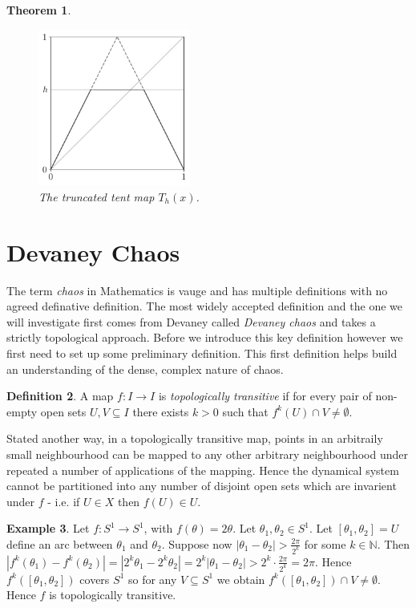 \documentclass[11pt,a4paper,oneside]{memoir}
\theoremstyle{plain}
\newtheorem{thm}{Theorem}[chapter]
\theoremstyle{definition}
\newtheorem{defn}[thm]{Definition}
\newtheorem{exmp}[thm]{Example}
\begin{document}
\begin{thm}
    \begin{figure}[h]
        \centering
        \includegraphics[width=5cm]{truncated_tent}
        \caption{The truncated tent map $T_h(x)$.}
        \label{fig:truncated_tent}
    \end{figure}
\end{thm}

\section{Devaney Chaos}

The term \emph{chaos} in Mathematics is vauge and has multiple definitions with no agreed definative definition. The most widely accepted definition and the one we will investigate first comes from Devaney \cite{devaney} called \emph{Devaney chaos} and takes a strictly topological approach. Before we introduce this key definition however we first need to set up some preliminary definition. This first definition helps build an understanding of the dense, complex nature of chaos.

\begin{defn}
    A map $f: I \to I$ is \emph{topologically transitive} if for every pair of non-empty open sets $U, V \subseteq I$ there exists $k > 0$ such that $f^k(U) \cap V \neq \emptyset$.
\end{defn}

Stated another way, in a topologically transitive map, points in an arbitraily small neighbourhood can be mapped to any other arbitrary neighbourhood under repeated a number of applications of the mapping. Hence the dynamical system cannot be partitioned into any number of disjoint open sets which are invarient under $f$ - i.e. if $U \in X$ then $f(U) \in U$.

\begin{exmp}
    Let $f: S^1 \to S^1$, with $f(\theta) = 2\theta$. Let $\theta_1, \theta_2 \in S^1$. Let $[\theta_1, \theta_2] = U$ define an arc between $\theta_1$ and $\theta_2$. Suppose now $|\theta_1 - \theta_2| > \frac{2\pi}{2^k}$ for some $k \in \mathbb{N}$. Then $\left\lvert f^k(\theta_1) - f^k(\theta_2)\right\rvert = \left\lvert 2^k\theta_1 - 2^k\theta_2 \right\rvert = 2^k \left\lvert \theta_1 - \theta_2 \right\rvert > 2^k \cdot \frac{2\pi}{2^k} = 2\pi$. Hence $f^k([\theta_1, \theta_2])$ covers $S^1$ so for any $V \subseteq S^1$ we obtain $f^k([\theta_1, \theta_2]) \cap V \neq \emptyset$. Hence $f$ is topologically transitive.
\end{exmp}
\end{document}
